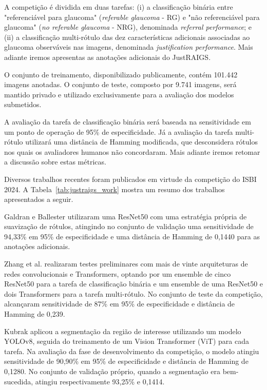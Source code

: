 \documentclass[12pt]{article}
\begin{document}
A competição é dividida em duas tarefas: (i) a classificação binária entre "referenciável para glaucoma" (\textit{referable glaucoma} - RG) e "não referenciável para glaucoma" (\textit{no referable glaucoma} -  NRG), denominada \textit{referral performance}; e (ii) a classificação multi-rótulo das dez características adicionais associadas ao glaucoma observáveis nas imagens, denominada \textit{justification performance}. Mais adiante iremos apresentas as anotações adicionais do JustRAIGS.

O conjunto de treinamento, disponibilizado publicamente, contém 101.442 imagens anotadas. O conjunto de teste, composto por 9.741 imagens, será mantido privado e utilizado exclusivamente para a avaliação dos modelos submetidos.

A avaliação da tarefa de classificação binária será baseada na sensitividade em um ponto de operação de 95\% de especificidade. Já a avaliação da tarefa multi-rótulo utilizará uma distância de Hamming modificada, que desconsidera rótulos nos quais os avaliadores humanos não concordaram. Mais adiante iremos retomar a discussão sobre estas métricas.

Diversos trabalhos recentes foram publicados em virtude da competição do ISBI 2024. A Tabela~\ref{tab:justraigs_work} mostra um resumo dos trabalhos apresentados a seguir.

Galdran e Ballester \cite{justraigs_galdran} utilizaram uma ResNet50 com uma estratégia própria de suavização de rótulos, atingindo no conjunto de validação uma sensitividade de 94,33\% em 95\% de especificidade e uma distância de Hamming de 0,1440 para as anotações adicionais.

Zhang et al. \cite{justraigs_zhang} realizaram testes preliminares com mais de vinte arquiteturas de redes convolucionais e Transformers, optando por um ensemble de cinco ResNet50 para a tarefa de classificação binária e um ensemble de uma ResNet50 e dois Transformers para a tarefa multi-rótulo. No conjunto de teste da competição, alcançaram sensitividade de 87\% em 95\% de especificidade e distância de Hamming de 0,239.

Kubrak \cite{justraigs_kubrak} aplicou a segmentação da região de interesse utilizando um modelo YOLOv8, seguida do treinamento de um Vision Transformer (ViT) para cada tarefa. Na avaliação da fase de desenvolvimento da competição, o modelo atingiu sensitividade de 90,90\% em 95\% de especificidade e distância de Hamming de 0,1280. No conjunto de validação próprio, quando a segmentação era bem-sucedida, atingiu respectivamente 93,25\% e 0,1414.
\end{document}
